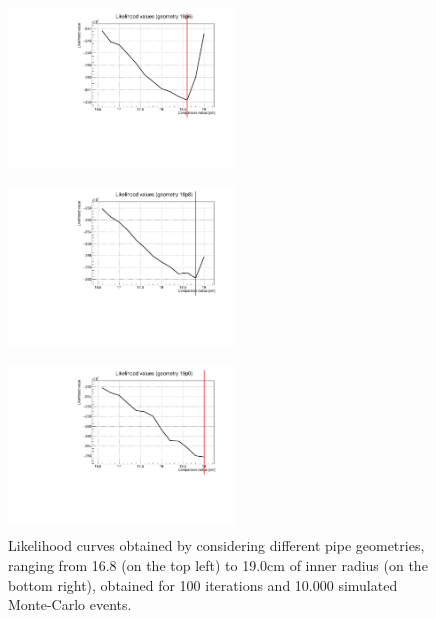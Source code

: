 \documentclass[a4paper, 11pt]{report}
\begin{document}
\begin{figure}[htbp]
\begin{minipage}[b]{.32\textwidth}
\includegraphics[width=6cm, height=4.6cm]{figs/likelihood100LowStat/likelihood18p6.pdf}
\end{minipage}\hfill
\begin{minipage}[b]{.32\textwidth}
\includegraphics[width=6cm, height=4.6cm]{figs/likelihood100LowStat/likelihood18p8.pdf}
\end{minipage} \hfill
\begin{minipage}[b]{.32\textwidth}
\includegraphics[width=6cm, height=4.6cm]{figs/likelihood100LowStat/likelihood19p0.pdf}
\end{minipage} \hfill
\caption{Likelihood curves obtained by considering different pipe geometries, ranging from 16.8 (on the top left) to 19.0cm of inner radius (on the bottom right), obtained for 100 iterations and 10.000 simulated Monte-Carlo events.}
\label{fig:likelihoods}
\end{figure}
\end{document}
